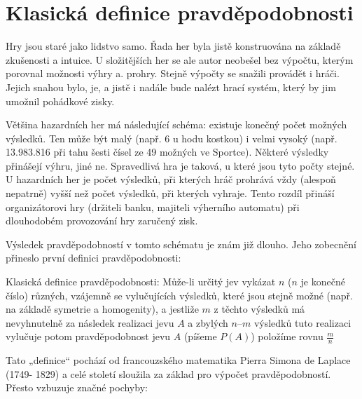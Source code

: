     
  
  \section{Klasická definice pravděpodobnosti}
    Hry jsou staré jako lidstvo samo. Řada her byla jistě konstruována na základě zkušenosti a
    intuice. U složitějších her se ale autor neobešel bez výpočtu, kterým porovnal možnosti výhry a.
    prohry. Stejně výpočty se snažili provádět i hráči. Jejich snahou bylo, je, a jistě i nadále
    bude nalézt hrací systém, který by jim umožnil pohádkové zisky.
    
    Většina hazardních her má následující schéma: existuje konečný počet možných výsledků. Ten může
    být malý (např. 6 u hodu kostkou) i velmi vysoký (např. 13.983.816 při tahu šesti čísel ze 49
    možných ve Sportce). Některé výsledky přinášejí výhru, jiné ne. Spravedlivá hra je taková, u
    které jsou tyto počty stejné. U hazardních her je počet výsledků, při kterých hráč prohrává vždy
    (alespoň nepatrně) vyšší než počet výsledků, při kterých vyhraje. Tento rozdíl přináší
    organizátorovi hry (držiteli banku, majiteli výherního automatu) při dlouhodobém provozování hry
    zaručený zisk.
    
    Výsledek pravděpodobností v tomto schématu je znám již dlouho. Jeho zobecnění přineslo první
    deﬁnici pravděpodobnosti:
    \begin{mdframed}[style=mdmathdef]
      \begin{definition}\label{mai:def001}
        Klasická definice pravděpodobnosti: Může-li určitý jev vykázat \(n\) (\(n\) je konečné
        číslo) různých, vzájemně se vylučujících výsledků, které jsou stejně možné (např. na základě
        symetrie   a homogenity), a jestliže \(m\) z těchto výsledků má nevyhnutelně za následek
        realizaci jevu \(A\) a zbylých \(n – m\) výsledků tuto realizaci vylučuje potom
        pravděpodobnost jevu \(A\) (píšeme \(P(A)\)) položíme rovnu \(\frac{m}{n}\)
      \end{definition}
    \end{mdframed}

    Tato „deﬁnice“ pochází od francouzského matematika Pierra Simona de Laplace (1749- 1829) a celé
    století sloužila za základ pro výpočet pravděpodobností. Přesto vzbuzuje značné pochyby:

